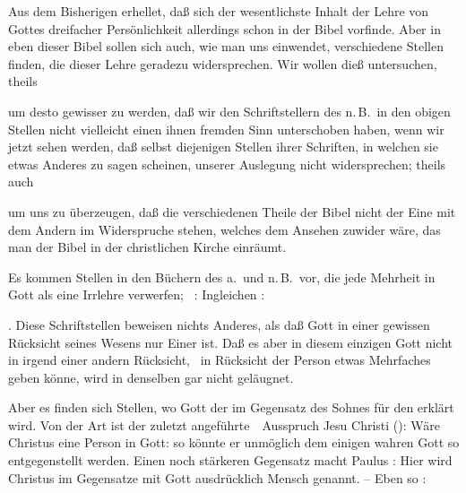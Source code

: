 Aus dem Bisherigen erhellet, daß sich der wesentlichste Inhalt der Lehre von Gottes dreifacher Persönlichkeit allerdings schon in der Bibel vorfinde. Aber in eben dieser Bibel sollen sich auch, wie man uns einwendet, verschiedene Stellen finden, die dieser Lehre geradezu widersprechen. Wir wollen dieß untersuchen, theils
\begin{aufzb}
\item um desto gewisser zu werden, daß wir den Schriftstellern des n.\,B.\ in den obigen Stellen nicht vielleicht einen ihnen fremden Sinn unterschoben haben, wenn wir jetzt sehen werden, daß selbst diejenigen Stellen ihrer Schriften, in welchen sie etwas Anderes zu sagen scheinen, unserer Auslegung nicht widersprechen; theils auch
\item um uns zu überzeugen, daß die verschiedenen Theile der Bibel nicht der Eine mit dem Andern im Widerspruche stehen, welches dem Ansehen zuwider wäre, das man der Bibel in der christlichen Kirche einräumt.
\end{aufzb}\par
{} Es kommen Stellen in den Büchern des a.\ und n.\,B.\ vor, die jede Mehrheit in Gott als eine Irrlehre verwerfen; \zB\ :  Ingleichen : \par
{}. Diese Schriftstellen beweisen nichts Anderes, als daß Gott in einer gewissen Rücksicht seines Wesens nur Einer ist. Daß es aber in diesem einzigen Gott nicht in irgend einer andern Rücksicht, \zB\ in Rücksicht der Person etwas Mehrfaches geben könne, wird in denselben gar nicht geläugnet.\par
{} Aber es finden sich Stellen, wo Gott der  im Gegensatz des Sohnes für den  erklärt wird. Von der Art ist der zuletzt angeführte~\ Ausspruch Jesu Christi ():  Wäre Christus eine Person in Gott: so könnte er unmöglich dem einigen wahren Gott so entgegenstellt werden. Einen noch stärkeren Gegensatz macht Paulus :  Hier wird Christus im Gegensatze mit Gott ausdrücklich Mensch genannt. -- Eben so : \par
